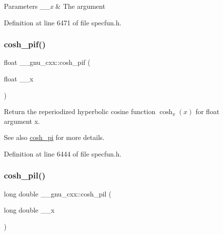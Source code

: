 \begin{DoxyParams}{Parameters}
{\em \+\_\+\+\_\+x} & The argument \\
\hline
\end{DoxyParams}


Definition at line 6471 of file specfun.\+h.

\mbox{\label{group__mathsf__gnu_ga79a2f5c9da96b5ea6c663d6efca24944}} 
\subsubsection{\texorpdfstring{cosh\+\_\+pif()}{cosh\_pif()}}
{\footnotesize\ttfamily float \+\_\+\+\_\+gnu\+\_\+cxx\+::cosh\+\_\+pif (\begin{DoxyParamCaption}\item[{float}]{\+\_\+\+\_\+x }\end{DoxyParamCaption})\hspace{0.3cm}{\ttfamily [inline]}}

Return the reperiodized hyperbolic cosine function $ \cosh_\pi(x) $ for {\ttfamily float} argument {\ttfamily x}.

\begin{DoxySeeAlso}{See also}
\hyperlink{group__mathsf__gnu_gaf59c68a01adfdab0f22c4fb405ab2a36}{cosh\+\_\+pi} for more details. 
\end{DoxySeeAlso}


Definition at line 6444 of file specfun.\+h.

\mbox{\label{group__mathsf__gnu_gab7bf4f591dd35af2bdb88a8219f5e248}} 
\subsubsection{\texorpdfstring{cosh\+\_\+pil()}{cosh\_pil()}}
{\footnotesize\ttfamily long double \+\_\+\+\_\+gnu\+\_\+cxx\+::cosh\+\_\+pil (\begin{DoxyParamCaption}\item[{long double}]{\+\_\+\+\_\+x }\end{DoxyParamCaption})\hspace{0.3cm}{\ttfamily [inline]}}

